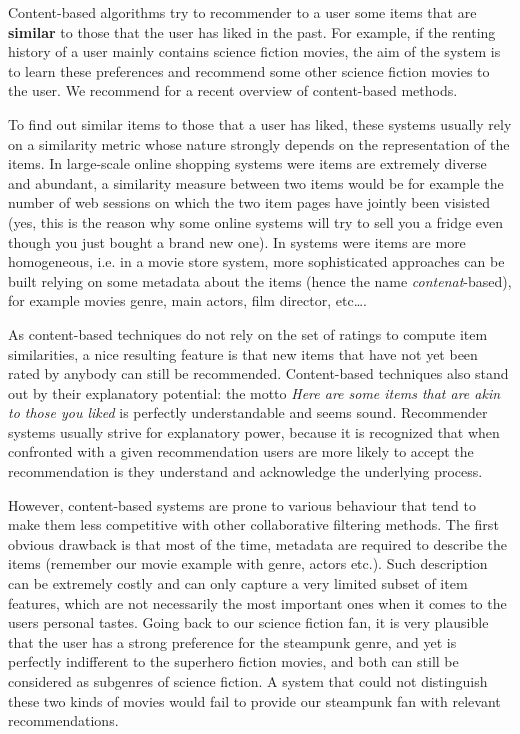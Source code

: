 Content-based algorithms try to recommender to a user some items that are
\textbf{similar} to those that the user has liked in the past. For example, if
the renting history of a user mainly contains science fiction movies, the aim
of the system is to learn these preferences and recommend some other science
fiction movies to the user. We recommend \cite[Ch.~3]{RecoSystemHandbook} for a
recent overview of content-based methods.

To find out similar items to those that a user has liked, these systems usually
rely on a similarity metric whose nature strongly depends on the representation
of the items. In large-scale online shopping systems were items are extremely
diverse and abundant, a similarity measure between two items would be for
example the number of web sessions on which the two item pages have jointly
been visisted (yes, this is the reason why some online systems will try to sell
you a fridge even though you just bought a brand new one). In systems were
items are more homogeneous, i.e. in a movie store system, more  sophisticated
approaches can be built relying on some metadata about the items (hence the
name \textit{contenat}-based), for example movies genre, main actors, film
director, etc\dots.

As content-based techniques do not rely on the set of ratings to compute item
similarities, a nice resulting feature is that new items that have not yet been
rated by anybody can still be recommended. Content-based techniques also stand
out by their explanatory potential: the motto \textit{Here are some items that
are akin to those you liked} is perfectly understandable and seems sound.
Recommender systems usually strive for explanatory power, because it is
recognized that when confronted with a given recommendation users are more
likely to accept the recommendation is they understand and acknowledge the
underlying process.

However, content-based systems are prone to various behaviour that tend to make
them less competitive with other collaborative filtering methods. The first
obvious drawback is that most of the time, metadata are required to describe
the items (remember our movie example with genre, actors etc.). Such
description can be extremely costly and can only capture a very limited subset
of item features, which are not necessarily the most important ones when it
comes to the users personal tastes. Going back to our science fiction fan, it
is very plausible that the user has a strong preference for the steampunk
genre, and yet is perfectly indifferent to the superhero fiction movies, and
both can still be considered as subgenres of science fiction. A system that
could not distinguish these two kinds of movies would fail to provide our
steampunk fan with relevant recommendations.

